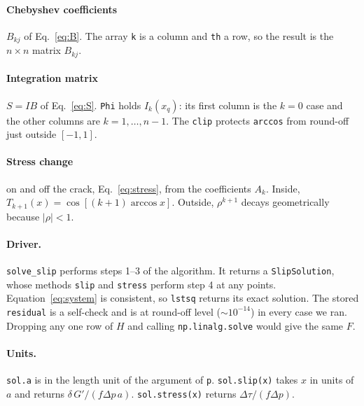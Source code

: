 \documentclass[12pt]{article}
\newcommand{\excerpt}[1]{}
\begin{document}
\paragraph{Chebyshev coefficients} $B_{kj}$ of Eq.~\eqref{eq:B}. The array
\texttt{k} is a column and \texttt{th} a row, so the result is the $n\times n$
matrix $B_{kj}$.
\excerpt{coefficients}

\paragraph{Integration matrix} $S = IB$ of Eq.~\eqref{eq:S}. \texttt{Phi} holds
$I_k(x_q)$: its first column is the $k=0$ case and the other columns are
$k=1,\dots,n-1$. The \texttt{clip} protects \texttt{arccos} from round-off just
outside $[-1,1]$.
\excerpt{integration}

\paragraph{Stress change} on and off the crack, Eq.~\eqref{eq:stress}, from the
coefficients $A_k$. Inside, $T_{k+1}(x) = \cos[(k+1)\arccos x]$. Outside,
$\rho^{k+1}$ decays geometrically because $|\rho|<1$.
\excerpt{stress}

\paragraph{Driver.} \texttt{solve\_slip} performs steps 1--3 of the algorithm.
It returns a \texttt{SlipSolution}, whose methods \texttt{slip} and
\texttt{stress} perform step 4 at any points. Equation~\eqref{eq:system} is
consistent, so \texttt{lstsq} returns its exact solution. The stored
\texttt{residual} is a self-check and is at round-off level ($\sim10^{-14}$)
in every case we ran. Dropping any one row of $H$ and calling
\texttt{np.linalg.solve} would give the same $F$.
\excerpt{solve}

\paragraph{Units.} \texttt{sol.a} is in the length unit of the argument of
\texttt{p}. \texttt{sol.slip(x)} takes $x$ in units of $a$ and returns
$\delta\,G'/(f\Delta p\,a)$. \texttt{sol.stress(x)} returns $\Delta\tau/(f\Delta p)$.
\end{document}
